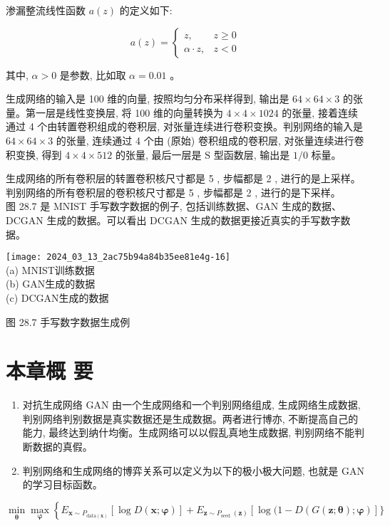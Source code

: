 \documentclass[10pt]{article}
\begin{document}
渗漏整流线性函数 $a(z)$ 的定义如下:

\[
a(z)= \begin{cases}z, & z \geqslant 0  \tag{28.15}\\ \alpha \cdot z, & z<0\end{cases}
\]

其中, $\alpha>0$ 是参数, 比如取 $\alpha=0.01$ 。

生成网络的输入是 100 维的向量, 按照均匀分布采样得到, 输出是 $64 \times 64 \times 3$ 的张量。第一层是线性变换层, 将 100 维的向量转换为 $4 \times 4 \times 1024$ 的张量, 接着连续通过 4 个由转置卷积组成的卷积层, 对张量连续进行卷积变换。判别网络的输入是 $64 \times 64 \times 3$ 的张量, 连续通过 4 个由 (原始) 卷积组成的卷积层, 对张量连续进行卷积变换, 得到 $4 \times 4 \times 512$ 的张量, 最后一层是 $\mathrm{S}$ 型函数层, 输出是 $1 / 0$ 标量。

生成网络的所有卷积层的转置卷积核尺寸都是 5 , 步幅都是 2 , 进行的是上采样。判别网络的所有卷积层的卷积核尺寸都是 5 , 步幅都是 2 , 进行的是下采样。\\
图 28.7 是 MNIST 手写数字数据的例子, 包括训练数据、GAN 生成的数据、DCGAN 生成的数据。可以看出 DCGAN 生成的数据更接近真实的手写数字数据。

\texttt{[image: 2024\_03\_13\_2ac75b94a84b35ee81e4g-16]}\\
(a) MNIST训练数据\\
(b) GAN生成的数据\\
(c) DCGAN生成的数据

图 28.7 手写数字数据生成例

\section*{本章概 要}
\begin{enumerate}
  \item 对抗生成网络 GAN 由一个生成网络和一个判别网络组成, 生成网络生成数据, 判别网络判别数据是真实数据还是生成数据。两者进行博亦, 不断提高自己的能力, 最终达到纳什均衡。生成网络可以以假乱真地生成数据, 判别网络不能判断数据的真假。

  \item 判别网络和生成网络的博弈关系可以定义为以下的极小极大问题, 也就是 GAN 的学习目标函数。

\end{enumerate}

$$
\min _{\boldsymbol{\theta}} \max _{\boldsymbol{\varphi}}\left\{E_{\boldsymbol{x} \sim P_{\mathrm{data}(\boldsymbol{x})}}[\log D(\boldsymbol{x} ; \boldsymbol{\varphi})]+E_{\boldsymbol{z} \sim P_{\text {seed }}(\boldsymbol{z})}[\log (1-D(G(\boldsymbol{z} ; \boldsymbol{\theta}) ; \boldsymbol{\varphi})]\}\right.
$$
\end{document}
